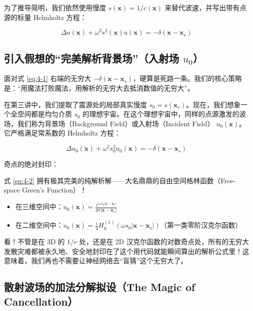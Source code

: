 \documentclass[12pt]{article}
\begin{document}
{为了推导简明，我们依然使用慢度 $s(\mathbf{x}) = 1/c(\mathbf{x})$ 来替代波速，并写出带有点源的标量 Helmholtz 方程：

\begin{equation}
\Delta u(\mathbf{x}) + \omega^2 s^2(\mathbf{x}) u(\mathbf{x}) = -\delta(\mathbf{x} - \mathbf{x}_s)
\label{eq:4-1}
\end{equation}

\subsection{引入假想的“完美解析背景场”（入射场 $u_0$）}

面对式 \eqref{eq:4-1} 右端的无穷大 $-\delta(\mathbf{x} - \mathbf{x}_s)$，硬算是死路一条。我们的核心策略是：“用魔法打败魔法，用解析的无穷大去抵消数值的无穷大”。

在第三讲中，我们提取了震源处的局部真实慢度 $s_0 = s(\mathbf{x}_s)$。现在，我们想象一个全空间都是均匀介质 $s_0$ 的理想宇宙。在这个理想宇宙中，同样的点源激发的波场，我们称为背景场（Background Field）或入射场（Incident Field） $u_0(\mathbf{x})$。
它严格满足常系数的 Helmholtz 方程：

\begin{equation}
\Delta u_0(\mathbf{x}) + \omega^2 s_0^2 u_0(\mathbf{x}) = -\delta(\mathbf{x} - \mathbf{x}_s)
\label{eq:4-2}
\end{equation}

奇点的绝对封印：

式 \eqref{eq:4-2} 拥有极其完美的纯解析解——大名鼎鼎的自由空间格林函数（Free-space Green's Function）！

\begin{itemize}[leftmargin=2em]
    \item 在三维空间中：$u_0(\mathbf{x}) = \frac{e^{i \omega s_0 |\mathbf{x} - \mathbf{x}_s|}}{4\pi |\mathbf{x} - \mathbf{x}_s|}$
    \item 在二维空间中：$u_0(\mathbf{x}) = \frac{i}{4} H_0^{(1)}(\omega s_0 |\mathbf{x} - \mathbf{x}_s|)$（第一类零阶汉克尔函数）
\end{itemize}

看！不管是在 3D 的 $1/r$ 处，还是在 2D 汉克尔函数的对数奇点处，所有的无穷大发散灾难都被永久地、安全地封印在了这个用代码就能瞬间算出的解析公式里！这意味着，我们再也不需要让神经网络去“盲猜”这个无穷大了。

\subsection{散射波场的加法分解拟设（The Magic of Cancellation）}

}
\end{document}
